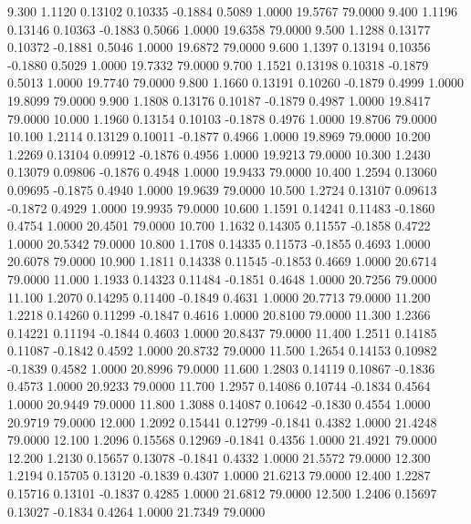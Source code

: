    9.300   1.1120   0.13102   0.10335  -0.1884   0.5089   1.0000  19.5767  79.0000
   9.400   1.1196   0.13146   0.10363  -0.1883   0.5066   1.0000  19.6358  79.0000
   9.500   1.1288   0.13177   0.10372  -0.1881   0.5046   1.0000  19.6872  79.0000
   9.600   1.1397   0.13194   0.10356  -0.1880   0.5029   1.0000  19.7332  79.0000
   9.700   1.1521   0.13198   0.10318  -0.1879   0.5013   1.0000  19.7740  79.0000
   9.800   1.1660   0.13191   0.10260  -0.1879   0.4999   1.0000  19.8099  79.0000
   9.900   1.1808   0.13176   0.10187  -0.1879   0.4987   1.0000  19.8417  79.0000
  10.000   1.1960   0.13154   0.10103  -0.1878   0.4976   1.0000  19.8706  79.0000
  10.100   1.2114   0.13129   0.10011  -0.1877   0.4966   1.0000  19.8969  79.0000
  10.200   1.2269   0.13104   0.09912  -0.1876   0.4956   1.0000  19.9213  79.0000
  10.300   1.2430   0.13079   0.09806  -0.1876   0.4948   1.0000  19.9433  79.0000
  10.400   1.2594   0.13060   0.09695  -0.1875   0.4940   1.0000  19.9639  79.0000
  10.500   1.2724   0.13107   0.09613  -0.1872   0.4929   1.0000  19.9935  79.0000
  10.600   1.1591   0.14241   0.11483  -0.1860   0.4754   1.0000  20.4501  79.0000
  10.700   1.1632   0.14305   0.11557  -0.1858   0.4722   1.0000  20.5342  79.0000
  10.800   1.1708   0.14335   0.11573  -0.1855   0.4693   1.0000  20.6078  79.0000
  10.900   1.1811   0.14338   0.11545  -0.1853   0.4669   1.0000  20.6714  79.0000
  11.000   1.1933   0.14323   0.11484  -0.1851   0.4648   1.0000  20.7256  79.0000
  11.100   1.2070   0.14295   0.11400  -0.1849   0.4631   1.0000  20.7713  79.0000
  11.200   1.2218   0.14260   0.11299  -0.1847   0.4616   1.0000  20.8100  79.0000
  11.300   1.2366   0.14221   0.11194  -0.1844   0.4603   1.0000  20.8437  79.0000
  11.400   1.2511   0.14185   0.11087  -0.1842   0.4592   1.0000  20.8732  79.0000
  11.500   1.2654   0.14153   0.10982  -0.1839   0.4582   1.0000  20.8996  79.0000
  11.600   1.2803   0.14119   0.10867  -0.1836   0.4573   1.0000  20.9233  79.0000
  11.700   1.2957   0.14086   0.10744  -0.1834   0.4564   1.0000  20.9449  79.0000
  11.800   1.3088   0.14087   0.10642  -0.1830   0.4554   1.0000  20.9719  79.0000
  12.000   1.2092   0.15441   0.12799  -0.1841   0.4382   1.0000  21.4248  79.0000
  12.100   1.2096   0.15568   0.12969  -0.1841   0.4356   1.0000  21.4921  79.0000
  12.200   1.2130   0.15657   0.13078  -0.1841   0.4332   1.0000  21.5572  79.0000
  12.300   1.2194   0.15705   0.13120  -0.1839   0.4307   1.0000  21.6213  79.0000
  12.400   1.2287   0.15716   0.13101  -0.1837   0.4285   1.0000  21.6812  79.0000
  12.500   1.2406   0.15697   0.13027  -0.1834   0.4264   1.0000  21.7349  79.0000
